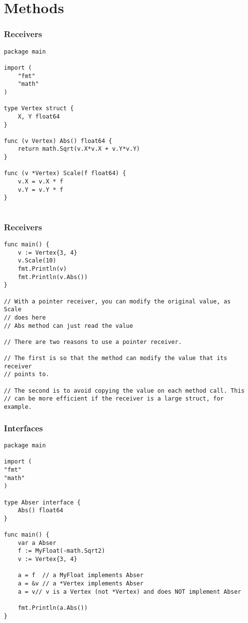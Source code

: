 \section{Methods}
\begin{frame}[fragile]
\frametitle{Receivers}

\begin{lstlisting}
package main

import (
    "fmt"
    "math"
)

type Vertex struct {
    X, Y float64
}

func (v Vertex) Abs() float64 {
    return math.Sqrt(v.X*v.X + v.Y*v.Y)
}

func (v *Vertex) Scale(f float64) {
    v.X = v.X * f
    v.Y = v.Y * f
}


\end{lstlisting}

\end{frame}


\begin{frame}[fragile]
\frametitle{Receivers}

\begin{lstlisting}
func main() {
    v := Vertex{3, 4}
    v.Scale(10)
    fmt.Println(v)
    fmt.Println(v.Abs())
}

// With a pointer receiver, you can modify the original value, as Scale 
// does here
// Abs method can just read the value

// There are two reasons to use a pointer receiver.

// The first is so that the method can modify the value that its receiver 
// points to.

// The second is to avoid copying the value on each method call. This 
// can be more efficient if the receiver is a large struct, for example. 
\end{lstlisting}

\end{frame}


\begin{frame}[fragile]
\frametitle{Interfaces}

\begin{lstlisting}
package main

import (
"fmt"
"math"
)

type Abser interface {
    Abs() float64
}

func main() {
    var a Abser
    f := MyFloat(-math.Sqrt2)
    v := Vertex{3, 4}

    a = f  // a MyFloat implements Abser
    a = &v // a *Vertex implements Abser
    a = v// v is a Vertex (not *Vertex) and does NOT implement Abser

    fmt.Println(a.Abs())
}
\end{lstlisting}
\end{frame}


